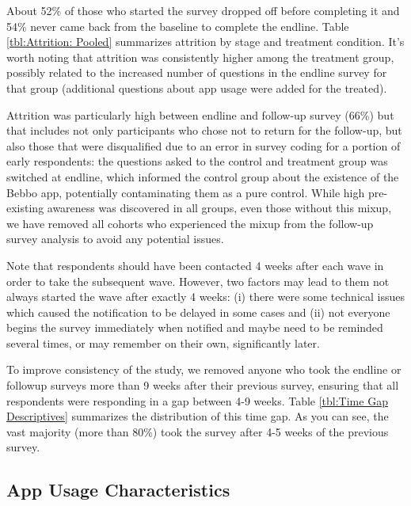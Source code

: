 \documentclass{article}
\begin{document}
About 52\% of those who started the survey dropped off before completing it and 54\% never came back from the baseline to complete the endline. Table \ref{tbl:Attrition: Pooled} summarizes attrition by stage and treatment condition. It's worth noting that attrition was consistently higher among the treatment group, possibly related to the increased number of questions in the endline survey for that group (additional questions about app usage were added for the treated).

Attrition was particularly high between endline and follow-up survey (66\%) but that includes not only participants who chose not to return for the follow-up, but also those that were disqualified due to an error in survey coding for a portion of early respondents: the questions asked to the control and treatment group was switched at endline, which informed the control group about the existence of the Bebbo app, potentially contaminating them as a pure control. While high pre-existing awareness was discovered in all groups, even those without this mixup, we have removed all cohorts who experienced the mixup from the follow-up survey analysis to avoid any potential issues.



Note that respondents should have been contacted 4 weeks after each wave in order to take the subsequent wave. However, two factors may lead to them not always started the wave after exactly 4 weeks: (i) there were some technical issues which caused the notification to be delayed in some cases and (ii) not everyone begins the survey immediately when notified and maybe need to be reminded several times, or may remember on their own, significantly later.

To improve consistency of the study, we removed anyone who took the endline or followup surveys more than 9 weeks after their previous survey, ensuring that all respondents were responding in a gap between 4-9 weeks. Table \ref{tbl:Time Gap Descriptives} summarizes the distribution of this time gap. As you can see, the vast majority (more than 80\%) took the survey after 4-5 weeks of the previous survey.



\subsection*{App Usage Characteristics}
\end{document}
